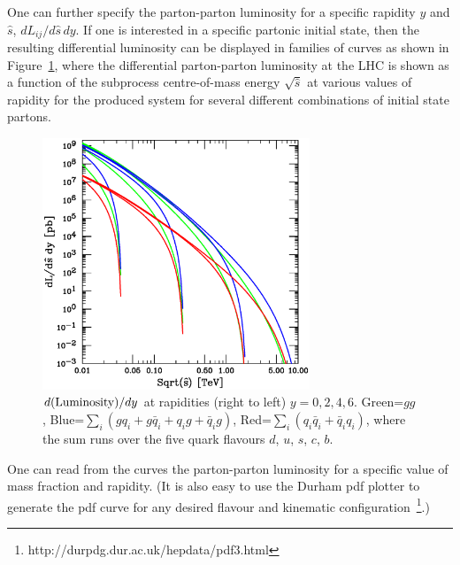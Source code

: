 \documentclass[12pt]{iopart}
\begin{document}
One can further specify the parton-parton luminosity for a specific  rapidity $y$ and $\hat{s}$,
$dL_{ij}/d\hat{s}\, dy$.  If one is interested in a specific partonic initial state, then the resulting
differential luminosity can be displayed in families of curves as shown in Figure~\ref{fig:figlum5}, where the
differential parton-parton luminosity at the LHC is shown as a function of the subprocess centre-of-mass energy
$\sqrt{\hat{s}}$ at various values of rapidity for the produced system for several different combinations of
initial state partons.
%
\begin{figure}[t]
\begin{center}
\includegraphics[width=8cm]{figlum5.ps}
\end{center}
\caption{
$d({\rm Luminosity})/dy$ at rapidities (right to left) $y=0, 2, 4, 6$.
Green=$gg$, 
Blue=$\sum_i (gq_i+g{\bar q}_i+q_ig+{\bar q}_ig)$,
Red=$\sum_i (q_i{\bar q}_i+{\bar q}_iq_i)$,
where the sum runs over the five quark flavours $d$, $u$, $s$, $c$, $b$.
} 
\label{fig:figlum5}
\end{figure}
%
One can read from the curves the parton-parton luminosity for a specific value of mass
fraction and  rapidity. (It is also easy to use the Durham pdf plotter to generate the pdf curve for any desired
flavour and kinematic configuration~\footnote{http://durpdg.dur.ac.uk/hepdata/pdf3.html}.) 

\end{document}
